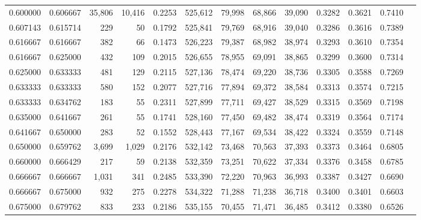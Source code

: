 \begin{tabular}{rrrrrrrrrrrrr}
0.600000 & 0.606667 & 35,806 & 10,416 &                                     0.2253 & 525,612 &  79,998 &  68,866 &  39,090 & 0.3282 & 0.3621 & 0.7410 \\
0.607143 & 0.615714 &    229 &     50 &                                     0.1792 & 525,841 &  79,769 &  68,916 &  39,040 & 0.3286 & 0.3616 & 0.7389 \\
0.616667 & 0.616667 &    382 &     66 &                                     0.1473 & 526,223 &  79,387 &  68,982 &  38,974 & 0.3293 & 0.3610 & 0.7354 \\
0.616667 & 0.625000 &    432 &    109 &                                     0.2015 & 526,655 &  78,955 &  69,091 &  38,865 & 0.3299 & 0.3600 & 0.7314 \\
0.625000 & 0.633333 &    481 &    129 &                                     0.2115 & 527,136 &  78,474 &  69,220 &  38,736 & 0.3305 & 0.3588 & 0.7269 \\
0.633333 & 0.633333 &    580 &    152 &                                     0.2077 & 527,716 &  77,894 &  69,372 &  38,584 & 0.3313 & 0.3574 & 0.7215 \\
0.633333 & 0.634762 &    183 &     55 &                                     0.2311 & 527,899 &  77,711 &  69,427 &  38,529 & 0.3315 & 0.3569 & 0.7198 \\
0.635000 & 0.641667 &    261 &     55 &                                     0.1741 & 528,160 &  77,450 &  69,482 &  38,474 & 0.3319 & 0.3564 & 0.7174 \\
0.641667 & 0.650000 &    283 &     52 &                                     0.1552 & 528,443 &  77,167 &  69,534 &  38,422 & 0.3324 & 0.3559 & 0.7148 \\
0.650000 & 0.659762 &  3,699 &  1,029 &                                     0.2176 & 532,142 &  73,468 &  70,563 &  37,393 & 0.3373 & 0.3464 & 0.6805 \\
0.660000 & 0.666429 &    217 &     59 &                                     0.2138 & 532,359 &  73,251 &  70,622 &  37,334 & 0.3376 & 0.3458 & 0.6785 \\
0.666667 & 0.666667 &  1,031 &    341 &                                     0.2485 & 533,390 &  72,220 &  70,963 &  36,993 & 0.3387 & 0.3427 & 0.6690 \\
0.666667 & 0.675000 &    932 &    275 &                                     0.2278 & 534,322 &  71,288 &  71,238 &  36,718 & 0.3400 & 0.3401 & 0.6603 \\
0.675000 & 0.679762 &    833 &    233 &                                     0.2186 & 535,155 &  70,455 &  71,471 &  36,485 & 0.3412 & 0.3380 & 0.6526 \\

\end{tabular}
